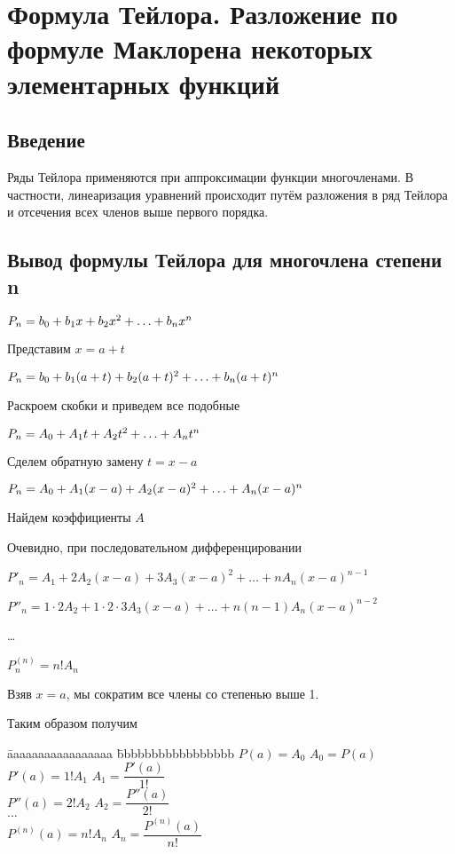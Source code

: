 \section{Формула Тейлора. Разложение по формуле Маклорена некоторых элементарных функций}

\subsection{Введение}

Ряды Тейлора применяются при аппроксимации функции многочленами. В частности, линеаризация уравнений происходит путём разложения в ряд Тейлора и отсечения всех членов выше первого порядка.


\subsection{Вывод формулы Тейлора для многочлена степени n}

$ P_n = b_0 + b_1 x + b_2 x^{2} + \ldots + b_n x^{n} $

Представим $ x = a+t $

$ P_n = b_0 + b_1 (a+t) + b_2 (a+t)^{2} + \ldots + b_n (a+t)^{n} $

Раскроем скобки и приведем все подобные

$ P_n = A_0 + A_1 t + A_2 t^{2} + \ldots + A_n t^{n} $

Сделем обратную замену $ t = x-a $

$ P_n = A_0 + A_1 (x-a) + A_2 (x-a)^{2} + \ldots + A_n (x-a)^{n} $

Найдем коэффициенты $ A $

Очевидно, при последовательном дифференцировании

$ P'_n = A_1 + 2 A_2 (x-a) + 3 A_3 (x-a)^{2} + \ldots + n A_n (x-a)^{n-1}$

$ P''_n = 1 \cdot 2 A_2 + 1 \cdot 2 \cdot 3 A_3 (x-a) + \ldots + n (n-1) A_n (x-a)^{n-2}$

\ldots

$ P^{(n)}_n = n! A_n $

Взяв $ x = a $, мы сократим все члены со степенью выше 1.

Таким образом получим

\begin{tabbing}
\=aaaaaaaaaaaaaaaaa \=bbbbbbbbbbbbbbbbb \kill
\>$ P(a) = A_0 $		\>$ A_0 = P(a) $ \\
\>$ P'(a) = 1! A_1$		\>$A_1 = \dfrac{P'(a)}{1!} $ \\
\>$ P''(a) = 2! A_2$	\>$A_2 = \dfrac{P''(a)}{2!} $ \\
\>$ \ldots $ \\
\>$ P^{(n)}(a) = n! A_n$	\>$A_n = \dfrac{P^{(n)}(a)}{n!} $
\end{tabbing}

